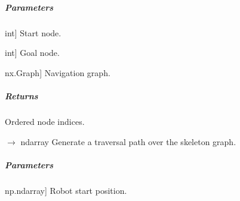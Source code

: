 \documentclass[letterpaper,10pt,english]{sphinxmanual}
\begin{document}
\begin{fulllineitems}
\begin{fulllineitems}
\subparagraph{Parameters}
\label{\detokenize{mirte_lc_nav2.navigators:id12}}\begin{description}
\sphinxlineitem{source}{[}int{]}
\sphinxAtStartPar
Start node.

\sphinxlineitem{target}{[}int{]}
\sphinxAtStartPar
Goal node.

\sphinxlineitem{graph}{[}nx.Graph{]}
\sphinxAtStartPar
Navigation graph.

\end{description}


\subparagraph{Returns}
\label{\detokenize{mirte_lc_nav2.navigators:id13}}\begin{description}
\sphinxAtStartPar
Ordered node indices.

\end{description}

\end{fulllineitems}


\begin{fulllineitems}
\label{\detokenize{mirte_lc_nav2.navigators:mirte_lc_nav2.navigators.SkeletonPath.name}}
\pysigstartsignatures
\pysigline
{}
\pysigstopsignatures
\end{fulllineitems}


\begin{fulllineitems}
\label{\detokenize{mirte_lc_nav2.navigators:mirte_lc_nav2.navigators.SkeletonPath.plan_path}}
\pysigstartsignatures
\pysiglinewithargsret
{}
{\sphinxparamcomma {}\sphinxparamcomma {}}
{{ $\rightarrow$ ndarray}}
\pysigstopsignatures
\sphinxAtStartPar
Generate a traversal path over the skeleton graph.


\subparagraph{Parameters}
\label{\detokenize{mirte_lc_nav2.navigators:id14}}\begin{description}
\sphinxlineitem{start}{[}np.ndarray{]}
\sphinxAtStartPar
Robot start position.


\end{description}
\end{fulllineitems}
\end{fulllineitems}
\end{document}
